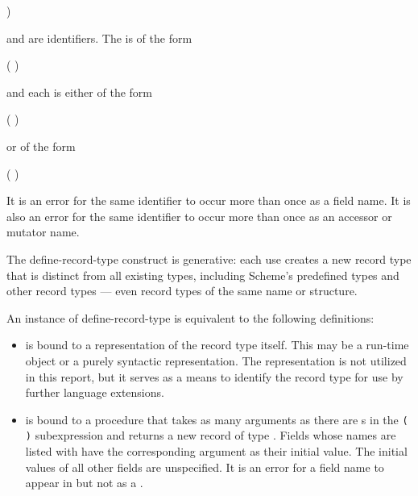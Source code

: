 \begin{entry}{%
)}

\syntax
{} and  are identifiers.
The  is of the form
\begin{scheme}
(  \dotsfoo)%
\end{scheme}
and each  is either of the form
\begin{scheme}
( )%
\end{scheme}
or of the form
\begin{scheme}
(  )%
\end{scheme}

It is an error for the same identifier to occur more than once as a
field name.
It is also an error for the same identifier to occur more than once
as an accessor or mutator name.

The {\cf define-record-type} construct is generative: each use creates a new record
type that is distinct from all existing types, including Scheme's
predefined types and other record types --- even record types of
the same name or structure.

An instance of {\cf define-record-type} is equivalent to the following
definitions:

\begin{itemize}

\item {} is bound to a representation of the record type itself.
This may be a run-time object or a purely syntactic representation.
The representation is not utilized in this report, but it serves as a
means to identify the record type for use by further language extensions.

\item {} is bound to a procedure that takes as
  many arguments as there are s in the
  \texttt{( \dotsfoo)} subexpression and returns a
  new record of type .  Fields whose names are listed with
   have the corresponding argument as their
  initial value.  The initial values of all other fields are
  unspecified.  It is an error for a field name to appear in
   but not as a .


\end{itemize}
\end{entry}
